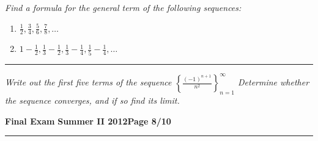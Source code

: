 \documentclass[12pt]{article}
\begin{document}
{\bigskip
{\problem[10 pts] \em  Find a formula for the general term of the following sequences:} 
\begin{enumerate}
\item $\displaystyle{\frac{1}{2}, \frac{3}{4}, \frac{5}{6}, \frac{7}{8}, \dotsc}$
\bigskip
\begin{flushright}
\end{flushright}
\item $\displaystyle{1-\frac{1}{2}, \frac{1}{3} - \frac{1}{2}, \frac{1}{3} - \frac{1}{4}, \frac{1}{5}-\frac{1}{4}, \dotsc}$
\vspace{3cm}
\begin{flushright}
\end{flushright}
\end{enumerate}
\hrule
{\problem[10pts] \em Write out the first five terms of the sequence $\left\{ \displaystyle{\frac{(-1)^{n+1}}{n^2}} \right\}_{n=1}^\infty$ \newline Determine whether the sequence converges, and if so find its limit.
\vspace{7cm}
\begin{flushright}
\end{flushright}
\newpage


\hfill{\large\bf Final Exam}\hfill{\large\bf
  Summer II 2012}\hfill{\large\bf Page 8/10}\hrule

}}
\end{document}

